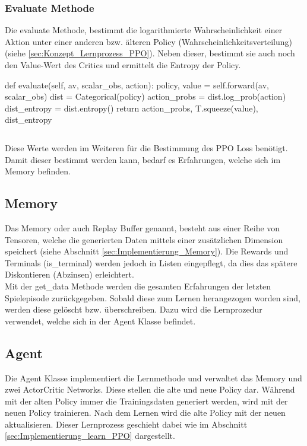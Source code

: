 \subsubsection{Evaluate Methode} \label{sec:Implementierung_Evaluate}
Die evaluate Methode, bestimmt die logarithmierte Wahrscheinlichkeit einer Aktion unter einer anderen bzw. älteren Policy (Wahrscheinlichkeitsverteilung) (siehe \ref{sec:Konzept_Lernprozess_PPO}). 
Neben dieser, bestimmt sie auch noch den Value-Wert des Critics und ermittelt die Entropy der Policy.
\begin{python}
def evaluate(self, av, scalar_obs, action):
	policy, value = self.forward(av, scalar_obs)
	dist = Categorical(policy)
	action_probs = dist.log_prob(action)
	dist_entropy = dist.entropy()
	return action_probs, T.squeeze(value), dist_entropy
\end{python}
\begin{lstlisting}[caption=Darstellung der evaluate Methode, label=code:evaluate_Methode]
\end{lstlisting}
Diese Werte werden im Weiteren für die Bestimmung des PPO Loss benötigt. Damit dieser bestimmt werden kann, bedarf es Erfahrungen, welche sich im Memory befinden.

\subsection{Memory}
Das Memory oder auch Replay Buffer genannt, besteht aus einer Reihe von Tensoren, welche die generierten Daten mittels einer zusätzlichen Dimension speichert (siehe Abschnitt \ref{sec:Implementierung_Memory}). Die Rewards und Terminals (is\_terminal) werden jedoch in Listen eingepflegt, da dies das spätere Diskontieren (Abzinsen) erleichtert.\\
Mit der get\_data Methode werden die gesamten Erfahrungen der letzten Spielepisode zurückgegeben. 
Sobald diese zum Lernen herangezogen worden sind, werden diese gelöscht bzw. überschreiben. Dazu wird die Lernprozedur verwendet, welche sich in der Agent Klasse befindet. 

\subsection{Agent} \label{sec:Implementierung_PPO_Agent}
Die Agent Klasse implementiert die Lernmethode und verwaltet das Memory und zwei ActorCritic Networks. Diese stellen die alte und neue Policy dar. Während mit der alten Policy immer die Trainingsdaten generiert werden, wird mit der neuen Policy trainieren. Nach dem Lernen wird die alte Policy mit der neuen aktualisieren. Dieser Lernprozess geschieht dabei wie im Abschnitt \ref{sec:Implementierung_learn_PPO} dargestellt.

